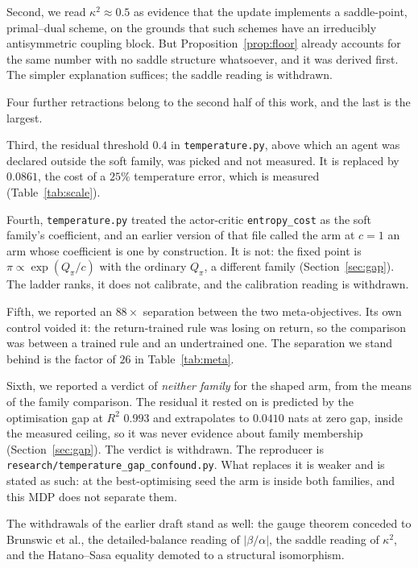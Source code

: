 \documentclass[11pt]{article}
\theoremstyle{remark}
\begin{document}
Second, we read $\kappa^2 \approx 0.5$ as evidence that the update implements a
saddle-point, primal--dual scheme, on the grounds that such schemes have an
irreducibly antisymmetric coupling block. But Proposition~\ref{prop:floor} already
accounts for the same number with no saddle structure whatsoever, and it was
derived first. The simpler explanation suffices; the saddle reading is withdrawn.

Four further retractions belong to the second half of this work, and the last is
the largest.

Third, the residual threshold $0.4$ in \texttt{temperature.py}, above which an
agent was declared outside the soft family, was picked and not measured. It is
replaced by $0.0861$, the cost of a $25\%$ temperature error, which is measured
(Table~\ref{tab:scale}).

Fourth, \texttt{temperature.py} treated the actor-critic \texttt{entropy\_cost}
as the soft family's coefficient, and an earlier version of that file called the
arm at $c = 1$ an arm whose coefficient is one by construction. It is not: the
fixed point is $\pi \propto \exp(Q_\pi / c)$ with the ordinary $Q_\pi$, a
different family (Section~\ref{sec:gap}). The ladder ranks, it does not
calibrate, and the calibration reading is withdrawn.

Fifth, we reported an $88\times$ separation between the two meta-objectives. Its
own control voided it: the return-trained rule was losing on return, so the
comparison was between a trained rule and an undertrained one. The separation we
stand behind is the factor of $26$ in Table~\ref{tab:meta}.

Sixth, we reported a verdict of \emph{neither family} for the shaped arm, from
the means of the family comparison. The residual it rested on is predicted by the
optimisation gap at $R^2$ $0.993$ and extrapolates to $0.0410$ nats at zero gap,
inside the measured ceiling, so it was never evidence about family membership
(Section~\ref{sec:gap}). The verdict is withdrawn. The reproducer is
\texttt{research/temperature\_gap\_confound.py}. What replaces it is weaker and
is stated as such: at the best-optimising seed the arm is inside both families,
and this MDP does not separate them.

The withdrawals of the earlier draft stand as well: the gauge theorem conceded to
Brunswic et al., the detailed-balance reading of $|\beta/\alpha|$, the saddle
reading of $\kappa^2$, and the Hatano--Sasa equality demoted to a structural
isomorphism.
\end{document}
